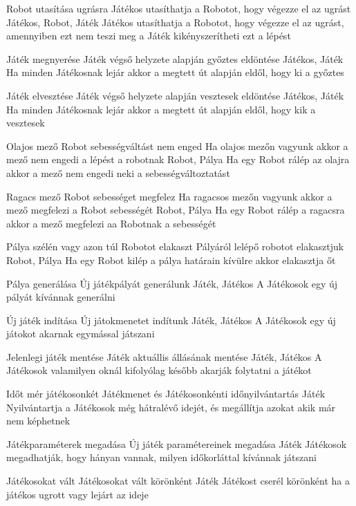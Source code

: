 \usecase%
{Robot utasítása ugrásra}%
{Játékos utasíthatja a Robotot, hogy végezze el az ugrást}%
{Játékos, Robot, Játék}%
{Játékos utasíthatja a Robotot, hogy végezze el az ugrást, amennyiben ezt nem teszi meg a Játék kikényszerítheti ezt a lépést}

\usecase%
{Játék megnyerése}%
{Játék végső helyzete alapján győztes eldöntése}%
{Játékos, Játék}%
{Ha minden Játékosnak lejár akkor a megtett út alapján eldől, hogy ki a győztes}

\usecase%
{Játék elvesztése}%
{Játék végső helyzete alapján vesztesek eldöntése}%
{Játékos, Játék}%
{Ha minden Játékosnak lejár akkor a megtett út alapján eldől, hogy kik a vesztesek}

\usecase%
{Olajos mező Robot sebességváltást nem enged}%
{Ha olajos mezőn vagyunk akkor a mező nem engedi a lépést a robotnak}%
{Robot, Pálya}%
{Ha egy Robot rálép az olajra akkor a mező nem engedi neki a sebességváltoztatást}

\usecase%
{Ragacs mező Robot sebességet megfelez}%
{Ha ragacsos mezőn vagyunk akkor a mező megfelezi a Robot sebességét}%
{Robot, Pálya}%
{Ha egy Robot rálép a ragacsra akkor a mező megfelezi aa Robotnak a sebességét}

\usecase%
{Pálya szélén vagy azon túl Robotot elakaszt}%
{Pályáról lelépő robotot elakasztjuk}%
{Robot, Pálya}%
{Ha egy Robot kilép a pálya határain kívülre akkor elakasztja őt}

\usecase%
{Pálya generálása}%
{Új játékpályát generálunk}%
{Játék, Játékos}%
{A Játékosok egy új pályát kívánnak generálni}

\usecase%
{Új játék indítása}%
{Új játokmenetet indítunk}%
{Játék, Játékos}%
{A Játékosok egy új játokot akarnak egymással játszani}

\usecase%
{Jelenlegi játék mentése}%
{Játék aktuállis állásának mentése}%
{Játék, Játékos}%
{A Játékosok valamilyen oknál kifolyólag később akarják folytatni a játékot}

\usecase%
{Időt mér játékosonkét}%
{Játékmenet és Játékosonkénti időnyilvántartás}%
{Játék}%
{Nyilvántartja a Játékosok még hátralévő idejét, és megállítja azokat akik már nem képhetnek}

\usecase%
{Játékparaméterek megadása}%
{Új játék paramétereinek megadása}%
{Játék}%
{Játékosok megadhatják, hogy hányan vannak, milyen időkorláttal kívánnak játszani}

\usecase%
{Játékosokat vált}%
{Játékosokat vált körönként}%
{Játék}%
{Játékost cserél körönként ha a játékos ugrott vagy lejárt az ideje}

